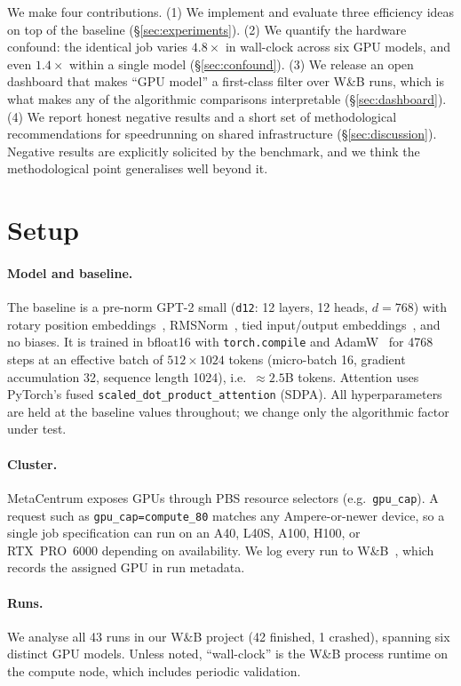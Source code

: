 \documentclass[11pt]{article}
\begin{document}
We make four contributions. (1) We implement and evaluate three efficiency ideas
on top of the baseline (\S\ref{sec:experiments}). (2) We quantify the hardware
confound: the identical job varies $4.8\times$ in wall-clock across six GPU
models, and even $1.4\times$ within a single model (\S\ref{sec:confound}). (3) We
release an open dashboard that makes ``GPU model'' a first-class filter over W\&B
runs, which is what makes any of the algorithmic comparisons interpretable
(\S\ref{sec:dashboard}). (4) We report honest negative results and a short set of
methodological recommendations for speedrunning on shared infrastructure
(\S\ref{sec:discussion}). Negative results are explicitly solicited by the
benchmark, and we think the methodological point generalises well beyond it.

\section{Setup}
\label{sec:setup}

\paragraph{Model and baseline.} The baseline is a pre-norm GPT-2 small
(\texttt{d12}: 12 layers, 12 heads, $d{=}768$) with rotary position
embeddings~\cite{su2021roformer}, RMSNorm~\cite{zhang2019rmsnorm}, tied input/output
embeddings~\cite{press2017tying}, and no biases. It is trained in bfloat16 with
\texttt{torch.compile} and AdamW~\cite{loshchilov2019adamw} for 4768 steps at an
effective batch of $512\times1024$ tokens (micro-batch 16, gradient accumulation
32, sequence length 1024), i.e.\ $\approx\!2.5$B tokens. Attention uses PyTorch's
fused \texttt{scaled\_dot\_product\_attention} (SDPA). All hyperparameters are held
at the baseline values throughout; we change only the algorithmic factor under test.

\paragraph{Cluster.} MetaCentrum exposes GPUs through PBS resource selectors
(e.g.\ \texttt{gpu\_cap}). A request such as \texttt{gpu\_cap=compute\_80}
matches any Ampere-or-newer device, so a single job specification can run on an
A40, L40S, A100, H100, or RTX~PRO~6000 depending on availability. We log every
run to W\&B~\cite{biewald2020wandb}, which records the assigned GPU in run
metadata.

\paragraph{Runs.} We analyse all 43 runs in our W\&B project (42 finished, 1
crashed), spanning six distinct GPU models. Unless noted, ``wall-clock'' is the
W\&B process runtime on the compute node, which includes periodic validation.
\end{document}
